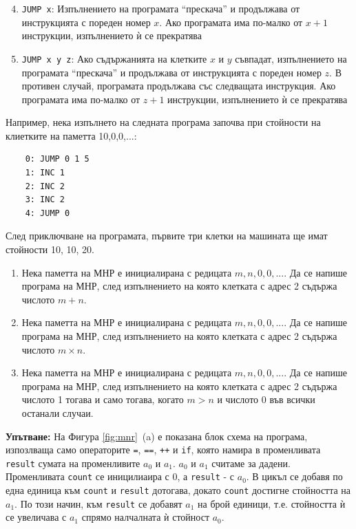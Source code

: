 \documentclass[12pt,a4paper]{article}
\newcommand{\code}[1]{\texttt{#1}}
\begin{document}
{\begin{mdframed}[hidealllines=true,backgroundcolor=gray!20]
	\begin{enumerate}[label=\arabic*)]
	\setcounter{enumi}{3}
		\item \code{JUMP x}: Изпълнението на програмата ``прескача'' и продължава от инструкцията с пореден номер $x$. Ако програмата има по-малко от $x+1$ инструкции, изпълнението ѝ се прекратява
		\item \code{JUMP x y z}: Ако съдържанията на клетките  $x$ и $y$ съвпадат, изпълнението на програмата ``прескача'' и продължава от инструкцията с пореден номер $z$. В противен случай, програмата продължава със следващата инструкция. Ако програмата има по-малко от $z+1$ инструкции, изпълнението ѝ се прекратява
	\end{enumerate}

	Например, нека изпълнето на следната програма започва при стойности на клиетките на паметта 10,0,0,...:

	\begin{verbatim}
	0: JUMP 0 1 5
	1: INC 1
	2: INC 2
	3: INC 2
	4: JUMP 0
	\end{verbatim}

	След приключване на програмата, първите три клетки на машината ще имат стойности 10, 10, 20.

\end{mdframed}

\begin{enumerate}[resume]
	\item Нека паметта на МНР е инициалирана с редицата $m,n,0,0,...$. Да се напише програма на МНР, след изпълнението на която клетката с адрес 2 съдържа числото $m+n$.
	\item Нека паметта на МНР е инициалирана с редицата $m,n,0,0,...$. Да се напише програма на МНР, след изпълнението на която клетката с адрес 2 съдържа числото $m \times n$.
	\item Нека паметта на МНР е инициалирана с редицата $m,n,0,0,...$. Да се напише програма на МНР, след изпълнението на която клетката с адрес 2 съдържа числото 1 тогава и само тогава, когато $m>n$ и числото 0 във всички останали случаи.
\end{enumerate}

\begin{mdframed}[hidealllines=true,backgroundcolor=gray!20]
\textbf{Упътване:} На Фигура \ref{fig:mnr}~(a) е показана блок схема на програма, изпозлваща само операторите \code{=}, \code{==}, \code{++} и \code{if}, която намира в променливата \code{result} сумата на променливите $a_0$ и $a_1$. $a_0$ и $a_1$ считаме за дадени. Променливата \code{count} се иницилиаира с 0, а \code{result} - с $a_0$. В цикъл се добавя по една единица към \code {count} и \code{result} дотогава, докато \code{count} достигне стойността на $a_1$. По този начин, към \code{result} се добавят $a_1$ на брой единици, т.е. стойността ѝ се увеличава с $a_1$ спрямо налчалната ѝ стойност $a_0$.


\end{mdframed}}
\end{document}
